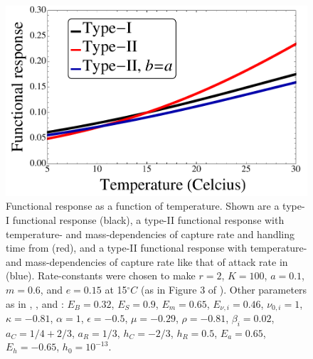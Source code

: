 \documentclass[11pt]{article}
\begin{document}
\begin{figure}[!ht]
\centering
\includegraphics[width=0.5\linewidth]{FunctionalResponseTemp}
\caption{
Functional response as a function of temperature.
Shown are a type-I functional response (black), a type-II functional response with temperature- and mass-dependencies of capture rate and handling time from \cite{Rall2012} (red), and a type-II functional response with temperature- and mass-dependencies of capture rate like that of attack rate in \cite{Gilbert2014} (blue).
Rate-constants were chosen to make $r = 2$, $K = 100$, $a = 0.1$, $m = 0.6$, and $e = 0.15$ at 15$^\circ C$ (as in Figure 3 of \cite{Gilbert2014}).
Other parameters as in \cite{Gilbert2014}, \cite{DeLong2015}, and \cite{Rall2012}: $E_B = 0.32$, $E_S = 0.9$, $E_m = 0.65$, $E_{\nu,i} = 0.46$, $\nu_{0,i} = 1$, $\kappa = -0.81$, $\alpha = 1$, $\epsilon = -0.5$, $\mu = -0.29$, $\rho = -0.81$, $\beta_i = 0.02$, $a_C = 1/4+2/3$, $a_R = 1/3$, $h_C = -2/3$, $h_R = 0.5$, $E_a = 0.65$, $E_h = -0.65$, $h_0 = 10^{-13}$.  
}
\label{FunctionalResponseTemp}
\end{figure}

\end{document}
